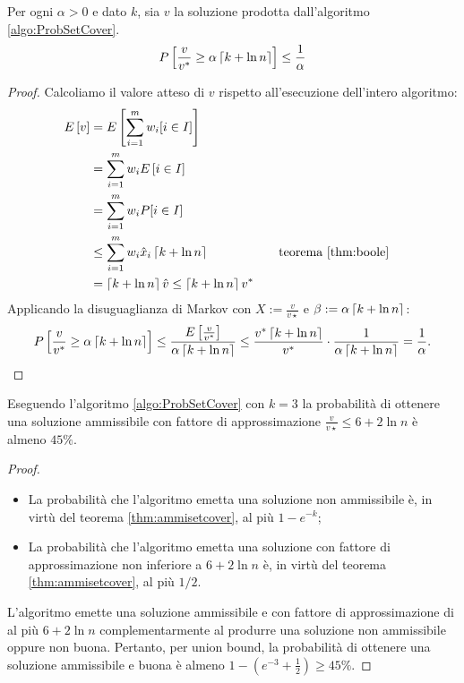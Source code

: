 \begin{theorem}\label{thm:ProbSetCoveralpha}
	Per ogni $\alpha>0$ e dato $k$, sia $v$ la soluzione prodotta dall'algoritmo \ref{algo:ProbSetCover}.
	\begin{equation*}
		P\left[\frac{v}{v^*}\geq\alpha\left\lceil k+\ln n \right\rceil\right] \leq \frac{1}{\alpha}
	\end{equation*}
\end{theorem}
\begin{proof}
	Calcoliamo il valore atteso di $v$ rispetto all'esecuzione dell'intero algoritmo:
	\begin{align*}
		E\left[v\right] & = E\left[\sum_{i=1}^m w_i [i\in I]\right]                                                           \\
		       & = \sum_{i=1}^m w_i E\left[i\in I\right]                                                             \\
		       & = \sum_{i=1}^m w_i P[i\in I]                                                               \\
		       & \leq \sum_{i=1}^m w_i \hat x_i\left\lceil k+\ln n \right\rceil     &  & \quad \text{teorema \ref{thm:boole}} \\
		       & = \left\lceil k+\ln n \right\rceil\hat v \leq \left\lceil k+\ln n \right\rceil v^*
	\end{align*}
	Applicando la disuguaglianza di Markov con $X:=\frac{v}{v\star}$ e $\beta:=\alpha\left\lceil k+\ln n \right\rceil$:
	\begin{equation*}
		P\left[\frac{v}{v^*}\geq\alpha\left\lceil k+\ln n \right\rceil\right] \leq \frac{E\left[\frac{v}{v^*}\right]}{\alpha\left\lceil k+\ln n \right\rceil} \leq \frac{v^*\left\lceil k+\ln n \right\rceil}{v^*}\cdot\frac{1}{\alpha\left\lceil k+\ln n \right\rceil}=\frac{1}{\alpha} \text.
	\end{equation*}
\end{proof}

\begin{corollario}
	Eseguendo l'algoritmo \ref{algo:ProbSetCover} con $k=3$ la probabilità di ottenere una soluzione ammissibile con fattore di approssimazione $\frac{v}{v\star}\leq 6+2\ln n$ è almeno $45\%$.
\end{corollario}
\begin{proof}~
	\begin{itemize}
		\item La probabilità che l'algoritmo emetta una soluzione non ammissibile è, in virtù del teorema \ref{thm:ammisetcover}, al più $1-e^{-k}$;
		\item La probabilità che l'algoritmo emetta una soluzione con fattore di approssimazione non inferiore a $6+2\ln n$ è, in virtù del teorema \ref{thm:ammisetcover}, al più $1/2$.
	\end{itemize}

	L'algoritmo emette una soluzione ammissibile e con fattore di approssimazione di al più $6+2\ln n$ complementarmente al produrre una soluzione non ammissibile oppure non buona.
	Pertanto, per union bound, la probabilità di ottenere una soluzione ammissibile e buona è almeno $1-(e^{-3}+\frac12)\geq 45\%$.
\end{proof}



